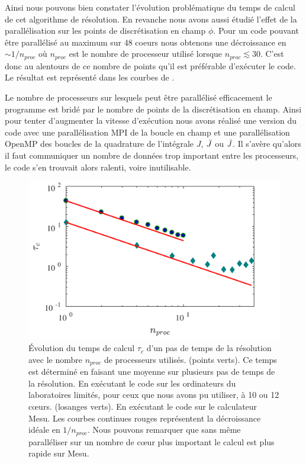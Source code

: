 \documentclass[10.5pt]{article}
\begin{document}
\begin{multicols}{2}
Ainsi nous pouvons bien constater l'évolution  problématique du temps de calcul de cet algorithme de résolution. En revanche nous avons aussi étudié l'effet de la parallélisation sur les points de discrétisation en champ $\phi$. Pour un code pouvant être parallélisé au maximum sur 48 coeurs nous obtenons une décroissance en $\sim 1/n_{proc}$ où $n_{proc}$ est le nombre de processeur utilisé lorsque $n_{proc} \lesssim 30$. C'est donc au alentours de ce nombre de points qu'il est préférable d'exécuter le code. Le résultat est représenté dans les courbes de .

Le nombre de processeurs sur lesquels peut être parallélisé efficacement le programme est bridé par le nombre de points de la discrétisation en champ. Ainsi pour tenter d'augmenter la vitesse d'exécution nous avons réalisé une version du code avec une parallélisation MPI \cite{open2012open} de la boucle en champ et une parallélisation OpenMP des boucles de la quadrature de l'intégrale $J$, $\bar{J}$ ou $\tilde{J}$. Il s'avère qu'alors il faut communiquer un nombre de données trop important entre les processeurs, le code s'en trouvait alors ralenti, voire inutilisable. 



\begin{figure}[H]
\begin{center}
	\includegraphics[width=0.95\columnwidth]{Scalabilite.pdf}
\end{center}
\caption{Évolution du temps de calcul $\tau_c$ d'un pas de temps de la résolution avec le nombre $n_{proc}$ de processeurs utilisés. (points verts). Ce temps est déterminé en faisant une moyenne sur  plusieurs pas de temps de la résolution. En exécutant le code sur les ordinateurs du laboratoires limités, pour ceux que nous avons pu utiliser, à 10 ou 12 cœurs. (losanges verts). En exécutant le code sur le calculateur Mesu. Les courbes continues rouges représentent la décroissance idéale en $1/n_{proc}$. Nous pouvons remarquer que sans même paralléliser sur un nombre de cœur plus important le calcul est plus rapide sur Mesu.}
\label{fig:timeScal}
\end{figure}




\end{multicols}
\end{document}
